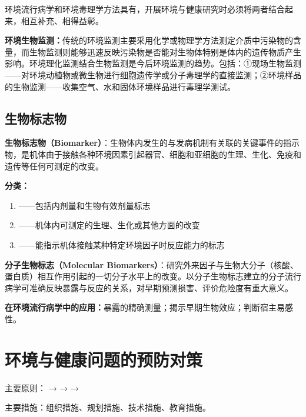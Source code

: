 \begin{tipbox}
环境流行病学和环境毒理学方法具有，开展环境与健康研究时必须将两者结合起来，相互补充、相得益彰。

\textbf{环境生物监测：}传统的环境监测主要采用化学或物理学方法测定介质中污染物的含量，而生物监测则能够迅速反映污染物是否能对生物体特别是体内的遗传物质产生影响。环境理化监测结合生物监测是今后环境监测的趋势。包括：①现场生物监测——对环境动植物或微生物进行细胞遗传学或分子毒理学的直接监测；②环境样品的生物监测——收集空气、水和固体环境样品进行毒理学测试。
\end{tipbox}

\subsection{生物标志物}

\begin{defbox}
\textbf{生物标志物（Biomarker）}：生物体内发生的与发病机制有关联的关键事件的指示物，是机体由于接触各种环境因素引起器官、细胞和亚细胞的生理、生化、免疫和遗传等任何可测定的改变。

\textbf{分类：}
\begin{enumerate}[leftmargin=*]
    \item {}——包括内剂量和生物有效剂量标志
    \item {}——机体内可测定的生理、生化或其他方面的改变
    \item {}——能指示机体接触某种特定环境因子时反应能力的标志
\end{enumerate}

\textbf{分子生物标志（Molecular Biomarkers）}：研究外来因子与生物大分子（核酸、蛋白质）相互作用引起的一切分子水平上的改变。以分子生物标志建立的分子流行病学可准确反映暴露与反应的关系，对早期预测损害、评价危险度有重大意义。

\textbf{在环境流行病学中的应用：}暴露的精确测量；揭示早期生物效应；判断宿主易感性。
\end{defbox}

\section{环境与健康问题的预防对策}

主要原则： →  →  → 

主要措施：组织措施、规划措施、技术措施、教育措施。

